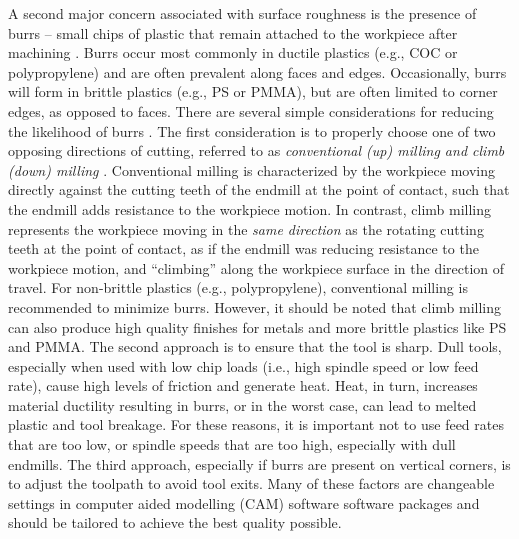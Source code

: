 A second major concern associated with surface roughness is the presence of burrs – small chips of plastic that remain attached to the workpiece after machining \cite{Lee2005}. Burrs occur most commonly in ductile plastics (e.g., COC or polypropylene) and are often prevalent along faces and edges. Occasionally, burrs will form in brittle plastics (e.g., PS or PMMA), but are often limited to corner edges, as opposed to faces. There are several simple considerations for reducing the likelihood of burrs \cite{Dimov2004}. The first consideration is to properly choose one of two opposing directions of cutting, referred to as \textit{conventional (up) milling and climb (down) milling} \cite{Toh2004}. Conventional milling is characterized by the workpiece moving directly against the cutting teeth of the endmill at the point of contact, such that the endmill adds resistance to the workpiece motion. In contrast, climb milling represents the workpiece moving in the \textit{same direction} as the rotating cutting teeth at the point of contact, as if the endmill was reducing resistance to the workpiece motion, and “climbing” along the workpiece surface in the direction of travel. For non-brittle plastics (e.g., polypropylene), conventional milling is recommended to minimize burrs. However, it should be noted that climb milling can also produce high quality finishes for metals \cite{Bernardos2002} and more brittle plastics like PS and PMMA. The second approach is to ensure that the tool is sharp. Dull tools, especially when used with low chip loads (i.e., high spindle speed or low feed rate), cause high levels of friction and generate heat. Heat, in turn, increases material ductility resulting in burrs, or in the worst case, can lead to melted plastic and tool breakage. For these reasons, it is important not to use feed rates that are too low, or spindle speeds that are too high, especially with dull endmills. The third approach, especially if burrs are present on vertical corners, is to adjust the toolpath to avoid tool exits. Many of these factors are changeable settings in computer aided modelling (CAM) software software packages and should be tailored to achieve the best quality possible.
